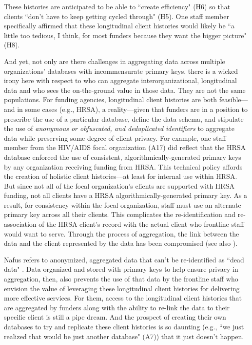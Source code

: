 These histories are anticipated to be able to ``create efficiency" (H6) so that clients ``don't have to keep getting cycled through" (H5). One staff member specifically affirmed that these longitudinal client histories would likely be ``a little too tedious, I think, for most funders because they want the bigger picture" (H8). 

And yet, not only are there challenges in aggregating data across multiple organizations' databases with incommensurate primary keys, there is a wicked irony here with respect to who can aggregate interorganizational, longitudinal data and who sees the on-the-ground value in those data. They are not the same populations. For funding agencies, longitudinal client histories are both feasible---and in some cases (e.g., HRSA), a reality---given that funders are in a position to prescribe the use of a particular database, define the data schema, and stipulate the use of \textit{anonymous or obfuscated, and deduplicated identifiers} to aggregate data while preserving some degree of client privacy. For example, one staff member from the HIV/AIDS focal organization (A17) did reflect that the HRSA database enforced the use of consistent, algorithmically-generated primary keys by any organization receiving funding from HRSA. This technical policy affords the creation of holistic client histories---at least for internal use within HRSA. But since not all of the focal organization's clients are supported with HRSA funding, not all clients have a HRSA algorithmically-generated primary key. As a result, for consistency within the focal organization, staff must use an alternate primary key across all their clients. This complicates the re-identification and re-association of the HRSA client's record with the actual client who frontline staff would want to serve. Through the process of aggregation, the link between the data and the client represented by the data has been compromised (see also \citep{Ribes2013DataBite}).

Nafus refers to anonymized, aggregated data that can't be re-identified as ``dead data" \citep{Nafus2014Stuck}. Data organized and stored with primary keys to help ensure privacy in aggregation, then, also prevents the use of that data by the frontline staff who envision the value of leveraging these longitudinal client histories for delivering more effective services. For them, access to the longitudinal client histories that are aggregated by funders along with the ability to re-link the data to their specific client is still a pipe dream. And the prospect of creating their own databases to try and replicate these client histories is so daunting (e.g., ``we just realized that would be just another database" (A7)) that it just doesn't happen.

